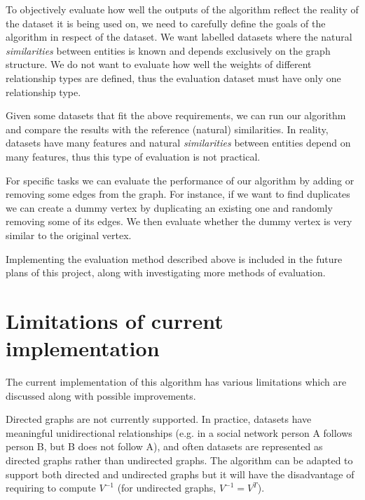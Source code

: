\documentclass[12pt]{report}
\begin{document}
To objectively evaluate how well the outputs of the algorithm reflect the reality
of the dataset it is being used on, we need to carefully define the goals of the
algorithm in respect of the dataset. We want labelled datasets where the natural
\textit{similarities} between entities is known and depends exclusively on the
graph structure. We do not want to evaluate how well the weights of different
relationship types are defined, thus the evaluation dataset must have only one
relationship type.


Given some datasets that fit the above requirements, we can run our algorithm and
compare the results with the reference (natural) similarities. In reality, datasets
have many features and natural \textit{similarities} between entities depend on many
features, thus this type of evaluation is not practical.


For specific tasks we can evaluate the performance of our algorithm by adding or
removing some edges from the graph. For instance, if we want to find duplicates
we can create a dummy vertex by duplicating an existing one and randomly removing
some of its edges. We then evaluate whether the dummy vertex is very similar to
the original vertex.


Implementing the evaluation method described above is included in the future plans
of this project, along with investigating more methods of evaluation.


%
%
\section*{Limitations of current implementation}
%
The current implementation of this algorithm has various limitations which are
discussed along with possible improvements.


Directed graphs are not currently supported. In practice, datasets have meaningful
unidirectional relationships (e.g. in a social network person A follows person B,
but B does not follow A), and often datasets are represented as directed graphs
rather than undirected graphs. The algorithm can be adapted to support both directed
and undirected graphs but it will have the disadvantage of requiring to compute
$V^{-1}$ (for undirected graphs, $V^{-1} = V^T$).
\end{document}

